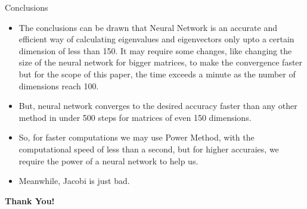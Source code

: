 \documentclass[13.5pt, aspectratio=169]{beamer}
\begin{document}
\begin{frame}{Conclusions}

    \begin{itemize}
        \item<1->[]The conclusions can be drawn that Neural Network is an accurate and efficient way of calculating eigenvalues and eigenvectors only upto a certain dimension of less than 150. It may require some changes, like changing the size of the neural network for bigger matrices, to make the convergence faster but for the scope of this paper, the time exceeds a minute as the number of dimensions reach 100.
        \item<2->[]But, neural network converges to the desired accuracy faster than any other method in under 500 steps for matrices of even 150 dimensions.
        \item<3->[]So, for faster computations we may use Power Method, with the computational speed of less than a second, but for higher accuraies, we require the power of a neural network to help us.
        \item<4->[]Meanwhile, Jacobi is just bad.
    \end{itemize}
    
\end{frame}

\begin{frame}
    \begin{center}
        \Huge \textbf{Thank You!}    
    \end{center}
\end{frame}
\end{document}
